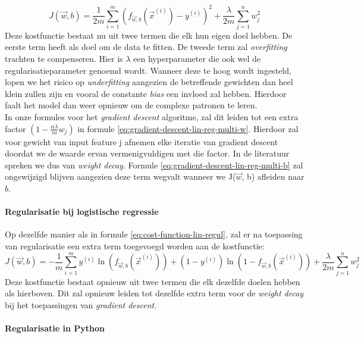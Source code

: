 \begin{equation}
	J(\vec{w}, b) = \frac{1}{2m} \sum_{i=1}^{m} (f_{\vec{w},b}(\vec{x}^{(i)}) - y^{(i)})^{2} + \frac{\lambda}{2m} \sum_{j=1}^{n} w_{j}^{2}
	\label{eq:cost-function-lin-regul}
\end{equation}
\noindent
Deze kostfunctie bestaat nu uit twee termen die elk hun eigen doel hebben. De eerste term heeft als doel om de data te fitten. De tweede term zal \textit{overfitting} trachten te compenseren. Hier is $\lambda$ een hyperparameter die ook wel de regularisatieparameter genoemd wordt. Wanneer deze te hoog wordt ingesteld, lopen we het risico op \textit{underfitting} aangezien de betreffende gewichten dan heel klein zullen zijn en vooral de constante \textit{bias} een invloed zal hebben. Hierdoor faalt het model dan weer opnieuw om de complexe patronen te leren. \\
\newline
In onze formules voor het \textit{gradient descent} algoritme, zal dit leiden tot een extra factor $(1-\frac{\alpha \lambda}{m} w_{j})$ in formule \ref{eq:gradient-descent-lin-reg-multi-w}. Hierdoor zal voor gewicht van input feature j afnemen elke iteratie van gradient descent doordat we de waarde ervan vermenigvuldigen met die factor. In de literatuur spreken we dus van \textit{weight decay}. Formule \ref{eq:gradient-descent-lin-reg-multi-b} zal ongewijzigd blijven aangezien deze term wegvalt wanneer we J($\vec{w}$, b) afleiden naar $b$.

\paragraph{Regularisatie bij logistische regressie}

Op dezelfde manier als in formule \ref{eq:cost-function-lin-regul}, zal er na toepassing van regularisatie een extra term toegevoegd worden aan de kostfunctie:
\begin{equation}
	J(\vec{w}, b) = -\frac{1}{m} \sum_{i=1}^{m} y^{(i)}\ln(f_{\vec{w},b}(\vec{x}^{(i)})) + (1 - y^{(i)}) \ln(1 - f_{\vec{w},b}(\vec{x}^{(i)})) + \frac{\lambda}{2m} \sum_{j=1}^{n} w_{j}^{2}
\end{equation}
\noindent
Deze kostfunctie bestaat opnieuw uit twee termen die elk dezelfde doelen hebben als hierboven. Dit zal opnieuw leiden tot dezelfde extra term voor de \textit{weight decay} bij het toepassingen van \textit{gradient descent}.

\paragraph{Regularisatie in Python}

